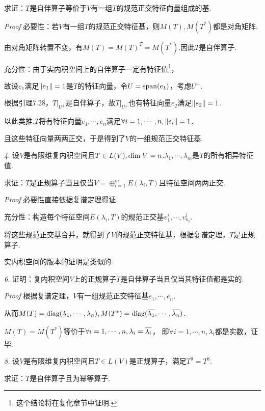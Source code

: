 求证：\(T\)是自伴算子等价于\(V\)有一组\(T\)的规范正交特征向量组成的基.

\textit{Proof}
必要性：若\(V\)有一组\(T\)的规范正交特征基，则\(M(T),M(T^*)\)都是对角矩阵.

由对角矩阵转置不变，有\(M(T)=M(T)^T=M(T^*)\).因此\(T\)是自伴算子.

充分性：由于实内积空间上的自伴算子一定有特征值\footnote{这个结论将在复化章节中证明.}，

故设\(e_1\)满足\(\left\lVert e_1 \right\rVert=1\)是\(T\)的特征向量，令\(U=\mathrm{span}(e_1)\)，考虑\(U^\bot\).

根据引理7.28，\(T|_{U^\bot}\)是自伴算子，故\(T|_{U^\bot}\)也有特征向量\(e_2\)满足\(\left\lVert e_2 \right\rVert=1\).

以此类推,\(T\)将有特征向量\(e_1,\cdots,e_n\)满足\(\forall i=1,\cdots,n,\left\lVert e_i \right\rVert=1\).

且这些特征向量两两正交，于是得到了\(V\)的一组规范正交特征基.

\newpage

\textit{4.}
设\(V\)是有限维复内积空间且\(T \in L(V),\mathrm{dim \;} V=n\).\(\lambda_1,\cdots,\lambda_m\)是\(T\)的所有相异特征值.

求证：\(T\)是正规算子当且仅当\(V=\oplus_{i=1}^m E(\lambda_i,T)\)且特征空间两两正交.

\textit{Proof}
必要性直接依据复谱定理得证.

充分性：构造每个特征空间\(E(\lambda_i,T)\)的规范正交基\(v_1^i,\cdots,v_{n_i}^i\).

将这些规范正交基合并，就得到了\(V\)的规范正交特征基，根据复谱定理，\(T\)是正规算子.

实内积空间的版本的证明是类似的.

\hspace*{\fill}

\textit{6.}
证明：复内积空间\(V\)上的正规算子\(T\)是自伴算子当且仅当其特征值都是实的.

\textit{Proof}
根据复谱定理，\(V\)有一组规范正交特征基\(e_1,\cdots,e_n\).

从而\(M(T)=\mathrm{diag}(\lambda_1,\cdots,\lambda_n),M(T^*)=\mathrm{diag}(\overline{\lambda_1},\cdots,\overline{\lambda_n})\).

\(M(T)=M(T^*)\)等价于\(\forall i=1,\cdots,n,\lambda_i=\overline{\lambda_i}\)，
即\(\forall i=1,\cdots,n,\lambda_i\)都是实数，证毕.

\hspace*{\fill}

\textit{8.}
设\(V\)是有限维复内积空间且\(T \in L(V)\)是正规算子，满足\(T^9=T^8\).

求证：\(T\)是自伴算子且为幂等算子.

